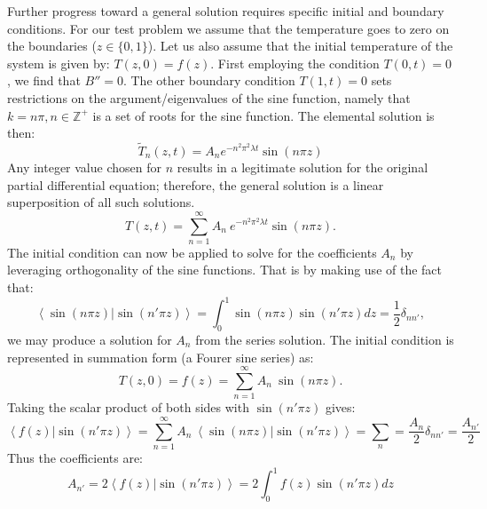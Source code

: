 \documentclass[11pt,letterpaper]{article}
\begin{document}
Further progress toward a general solution requires specific initial and boundary conditions.  For our test problem we assume that the temperature goes to zero on the boundaries ($z \in \{0,1\}$).  Let us also assume that the initial temperature of the system is given by:  $T(z,0) = f(z)$.  First employing the condition $T(0,t)=0$, we find that $B''=0$.  The other boundary condition $T(1,t)=0$ sets restrictions on the argument/eigenvalues of the sine function, namely that $k=n \pi, n \in \mathbb{Z}^+$ is a set of roots for the sine function.  The elemental solution is then:
\begin{equation}
\tilde{T}_n(z,t)= A_n e^{-n^2 \pi^2 \lambda t} \sin \left( n \pi z \right)
\end{equation}
Any integer value chosen for $n$ results in a legitimate solution for the original partial differential equation; therefore, the general solution is a linear superposition of all such solutions.  
\begin{equation}
T(z,t)= \sum_{n=1}^{\infty} A_n ~ e^{-n^2 \pi^2 \lambda t} \sin \left( n \pi z \right).
\end{equation}
The initial condition can now be applied to solve for the coefficients $A_n$ by leveraging orthogonality of the sine functions.  That is by making use of the fact that:
\begin{equation}
\left< \sin(n \pi z) | \sin (n' \pi z) \right> = \int_0^1 \sin(n \pi z) \sin (n' \pi z) dz = \frac{1}{2} \delta_{nn'},
\end{equation}
we may produce a solution for $A_n$ from the series solution.  The initial condition is represented in summation form (a Fourer sine series) as:  
\begin{equation}
T(z,0) = f(z) = \sum_{n=1}^{\infty} A_n ~ \sin \left( n \pi z \right).
\end{equation}
Taking the scalar product of both sides with $\sin (n' \pi z)$ gives:
\begin{equation}
\left< f(z) | \sin (n' \pi z) \right> = \sum_{n=1}^{\infty} A_n ~ \left< \sin(n \pi z) | \sin (n' \pi z) \right> = \sum_n = \frac{A_n}{2} \delta_{nn'} = \frac{A_{n'}}{2}
\end{equation}
Thus the coefficients are:  
\begin{equation}
A_{n'} = 2 \left< f(z) | \sin (n' \pi z) \right> = 2 \int_0^1 f(z) \sin (n' \pi z) dz
\end{equation}
\end{document}
